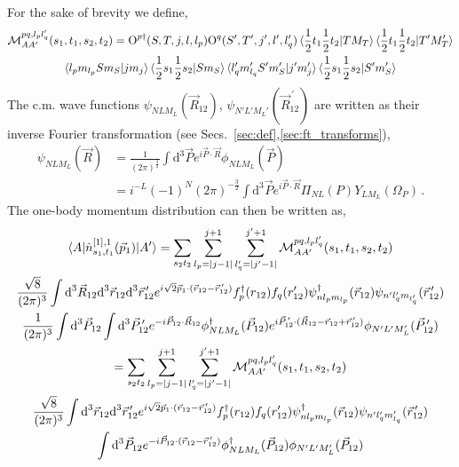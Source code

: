 \documentclass[10pt]{article}
\begin{document}
For the sake of brevity we define,
\begin{multline}
 \mathcal{M}_{AA'}^{p q,l_p l_q'}(s_1,t_1,s_2,t_2) = \text{O}^{p\dagger}(S,T,j,l,l_p) \text{O}^{q}(S',T',j',l',l_q') \braket{ \frac{1}{2} t_1 \frac{1}{2} t_2 | T M_T } \braket{ \frac{1}{2} t_1 \frac{1}{2} t_2 | T' M_T'} \\
	\braket{ l_p  m_{l_p} S m_S | j m_j } \braket{   \frac{1}{2} s_1 \frac{1}{2} s_2 | S m_S} 
	\braket{ l_q' m_{l_q}' S' m_S' | j' m_j' } \braket{   \frac{1}{2} s_1 
\frac{1}{2} s_2 | S' m_S'} 
\label{eq:def_M}
\end{multline}
The c.m. wave functions $\psi_{N L M_L}(\vec{R}_{12})$, $\psi_{N' L' M_L'}(\vec{R}^{\, \prime}_{12})$ are written as their inverse Fourier transformation (see Secs.~\ref{sec:def},\ref{sec:ft_transforms}),
\begin{align}
	\psi_{N L M_L}(\vec{R}) &= \frac{1}{(2 \pi)^{\frac{3}{2}}} \int \text{d}^{3} \vec{P} e^{i \vec{P} \cdot \vec{R}} \phi_{N L M_{L}}(\vec{P}) \\
	&= i^{-L} (-1)^{N} (2 \pi)^{-\frac{3}{2}} \int \text{d}^{3} \vec{P} e^{i \vec{P} \cdot \vec{R}}  \Pi_{N L}(P)  Y_{L M_L}(\Omega_P) \, .
\end{align}
The one-body momentum distribution can then be written as,
\begin{multline*}
	\braket{ A | \hat{n}_{s_1,t_1}^{[1],1}(\vec{p}_1) | A'} = \sum_{s_2 t_2}  \sum_{l_p = |j-1|}^{j+1} \sum_{l_q' = |j' - 1|}^{j'+1} \mathcal{M}_{AA'}^{p q,l_p l_q'}(s_1,t_1,s_2,t_2) \\
   \frac{\sqrt{8}}{(2 \pi)^{3}} \int \text{d}^{3} \vec{R}_{12} \text{d}^{3} \vec{r}_{12} \text{d}^{3} \vec{r}_{12}^{\, \prime}  e^{ i \sqrt{2} \vec{p}_{1} \cdot ( \vec{r}_{12} - \vec{r}_{12}^{\, \prime}) }  f_{p}^{\dagger}(r_{12}) f_{q}(r_{12}') \psi_{ n l_p m_{l_p} }^{\dagger}(\vec{r}_{12}) \psi_{ n' l_q' m_{l_q'} }(\vec{r}_{12}^{\, \prime})  \\
   \frac{1}{(2 \pi)^{3}} \int \text{d}^{3} \vec{P}_{12} \int \text{d}^{3} \vec{P}_{12}^{\, \prime} e^{ -i \vec{P}_{12} \cdot \vec{R}_{12}} \phi_{N L M_L}^{\dagger}(\vec{P}_{12}) e^{ i \vec{P}_{12}^{\, \prime} \cdot ( \vec{R}_{12} - \vec{r}_{12} + \vec{r}_{12}^{\, \prime})} \phi_{N' L' M_L'}(\vec{P}_{12}^{\, \prime}) \\
   = \sum_{s_2 t_2}  \sum_{l_p = |j-1|}^{j+1} \sum_{l_q' = |j' - 1|}^{j'+1} \mathcal{M}_{AA'}^{p q,l_p l_q'}(s_1,t_1,s_2,t_2) \\
    \frac{\sqrt{8}}{(2 \pi)^{3}} \int \text{d}^{3} \vec{r}_{12} \text{d}^{3} \vec{r}_{12}^{\, \prime}  e^{ i \sqrt{2} \vec{p}_{1} \cdot ( \vec{r}_{12} - \vec{r}_{12}^{\, \prime}) } f_{p}^{\dagger}(r_{12}) f_{q}(r_{12}')  \psi_{ n l_p m_{l_p}}^{\dagger}(\vec{r}_{12}) \psi_{ n' l_q' m_{l_q}' }(\vec{r}_{12}^{\, \prime}) \\
   \int \text{d}^{3} \vec{P}_{12} e^{ -i \vec{P}_{12} \cdot (\vec{r}_{12} - \vec{r}_{12}^{\, \prime})} \phi_{N L M_L}^{\dagger}(\vec{P}_{12}) \phi_{N' L' M_L'}(\vec{P}_{12}) 
\end{multline*}
\end{document}
